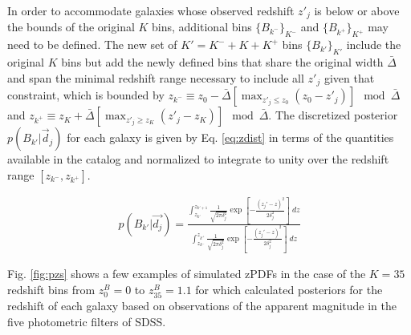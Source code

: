 \documentclass[preprint]{aastex}
\begin{document}

In order to accommodate galaxies whose observed redshift $z'_{j}$ is below or above the bounds of the original $K$ bins, additional bins $\{B_{k^{-}}\}_{K^{-}}$ and $\{B_{k^{+}}\}_{K^{+}}$ may need to be defined.  The new set of $K'=K^{-}+K+K^{+}$ bins $\{B_{k'}\}_{K'}$ include the original $K$ bins but add the newly defined bins that share the original width $\bar{\Delta}$ and span the minimal redshift range necessary to include all $z'_{j}$ given that constraint, which is bounded by $z_{k^{-}}\equiv z_{0}-\bar{\Delta}[\max_{z'_{j}\leq z_{0}}(z_{0}-z'_{j})]\mod\bar{\Delta}$ and $z_{k^{+}}\equiv z_{K}+\bar{\Delta}[\max_{z'_{j}\geq z_{K}}(z'_{j}-z_{K})]\mod\bar{\Delta}$.  The discretized posterior $p(B_{k'}|\vec{d}_{j})$ for each galaxy is given by Eq. \ref{eq:zdist} in terms of the quantities available in the catalog and normalized to integrate to unity over the redshift range $[z_{k^{-}},z_{k^{+}}]$.  

\begin{eqnarray}
\label{eq:zdist}
p(B_{k'}|\vec{d_{j}}) = \frac{\int_{z_{k'}}^{z_{k'+1}} \frac{1}{\sqrt{2\pi\delta_{j}^{2}}}\exp\left[-\frac{(z_{j}'-z)^{2}}{2\delta_{j}^{2}}\right]\ dz}{\int_{z_{k^{-}}}^{z_{k^{+}}} \frac{1}{\sqrt{2\pi\delta_{j}^{2}}}\exp\left[-\frac{(z_{j}'-z)^{2}}{2\delta_{j}^{2}}\right]\ dz}
\end{eqnarray}

Fig. \ref{fig:pzs} shows a few examples of simulated zPDFs in the case of the $K=35$ redshift bins from $z^{B}_{0}=0$ to $z^{B}_{35}=1.1$ for which \citet{she11} calculated posteriors for the redshift of each galaxy based on observations of the apparent magnitude in the five photometric filters of SDSS.  
\end{document}
